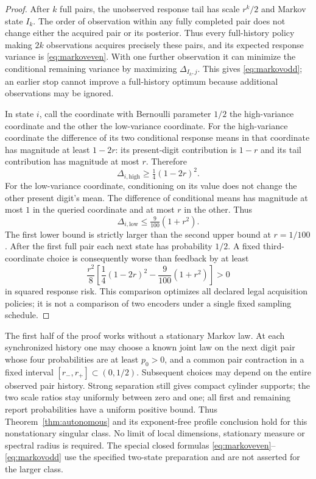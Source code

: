 \begin{proof}
After $k$ full pairs, the unobserved response tail has scale $r^k/2$ and Markov state $I_k$. The order of observation within any fully completed pair does not change either the acquired pair or its posterior. Thus every full-history policy making $2k$ observations acquires precisely these pairs, and its expected response variance is \eqref{eq:markoveven}. With one further observation it can minimize the conditional remaining variance by maximizing $\Delta_{I_k,j}$. This gives \eqref{eq:markovodd}; an earlier stop cannot improve a full-history optimum because additional observations may be ignored.

In state $i$, call the coordinate with Bernoulli parameter $1/2$ the high-variance coordinate and the other the low-variance coordinate. For the high-variance coordinate the difference of its two conditional response means in that coordinate has magnitude at least $1-2r$: its present-digit contribution is $1-r$ and its tail contribution has magnitude at most $r$. Therefore
\[
 \Delta_{i,\mathrm{high}}\ge\tfrac14(1-2r)^2.
\]
For the low-variance coordinate, conditioning on its value does not change the other present digit's mean. The difference of conditional means has magnitude at most $1$ in the queried coordinate and at most $r$ in the other. Thus
\[
 \Delta_{i,\mathrm{low}}\le\tfrac9{100}(1+r^2).
\]
The first lower bound is strictly larger than the second upper bound at $r=1/100$. After the first full pair each next state has probability $1/2$. A fixed third-coordinate choice is consequently worse than feedback by at least
\begin{equation}\label{eq:strictadaptivegap}
 \frac{r^2}{8}\left[\frac14(1-2r)^2-
                 \frac9{100}(1+r^2)\right]>0
\end{equation}
in squared response risk. This comparison optimizes all declared legal acquisition policies; it is not a comparison of two encoders under a single fixed sampling schedule.
\end{proof}

\begin{remark}
The first half of the proof works without a stationary Markov law. At each synchronized history one may choose a known joint law on the next digit pair whose four probabilities are at least $p_0>0$, and a common pair contraction in a fixed interval $[r_-,r_+]\subset(0,1/2)$. Subsequent choices may depend on the entire observed pair history. Strong separation still gives compact cylinder supports; the two scale ratios stay uniformly between zero and one; all first and remaining report probabilities have a uniform positive bound. Thus Theorem~\ref{thm:autonomous} and its exponent-free profile conclusion hold for this nonstationary singular class. No limit of local dimensions, stationary measure or spectral radius is required. The special closed formulas \eqref{eq:markoveven}--\eqref{eq:markovodd} use the specified two-state preparation and are not asserted for the larger class.
\end{remark}

